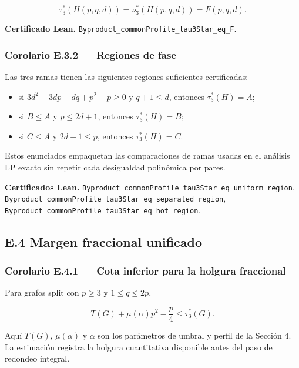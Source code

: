 \documentclass[
  spanish,
  11pt,
  a4paper,
]{article}
\providecommand{\tightlist}{%
  \setlength{\itemsep}{0pt}\setlength{\parskip}{0pt}}
\begin{document}
\[\tau_3^*(H(p,q,d))=\nu_3^*(H(p,q,d))=F(p,q,d).\]

\textbf{Certificado Lean.} \texttt{Byproduct\_commonProfile\_tau3Star\_eq\_F}.

\subsubsection{Corolario E.3.2 --- Regiones de fase}\label{corolario-e.3.2-regiones-de-fase}

Las tres ramas tienen las siguientes regiones suficientes certificadas:

\begin{itemize}
\tightlist
\item
  si \(3d^2-3dp-dq+p^2-p\ge0\) y \(q+1\le d\), entonces \(\tau_3^*(H)=A\);
\item
  si \(B\le A\) y \(p\le2d+1\), entonces \(\tau_3^*(H)=B\);
\item
  si \(C\le A\) y \(2d+1\le p\), entonces \(\tau_3^*(H)=C\).
\end{itemize}

Estos enunciados empaquetan las comparaciones de ramas usadas en el análisis LP exacto sin repetir cada desigualdad polinómica por pares.

\textbf{Certificados Lean.} \texttt{Byproduct\_commonProfile\_tau3Star\_eq\_uniform\_region}, \texttt{Byproduct\_commonProfile\_tau3Star\_eq\_separated\_region}, \texttt{Byproduct\_commonProfile\_tau3Star\_eq\_hot\_region}.

\subsection{E.4 Margen fraccional unificado}\label{e.4-margen-fraccional-unificado}

\subsubsection{Corolario E.4.1 --- Cota inferior para la holgura fraccional}\label{corolario-e.4.1-cota-inferior-para-la-holgura-fraccional}

Para grafos split con \(p\ge3\) y \(1\le q\le2p\),

\[T(G)+\mu(\alpha)p^2-\frac p4\le\tau_3^*(G).\]

Aquí \(T(G)\), \(\mu(\alpha)\) y \(\alpha\) son los parámetros de umbral y perfil de la Sección 4. La estimación registra la holgura cuantitativa disponible antes del paso de redondeo integral.
\end{document}
